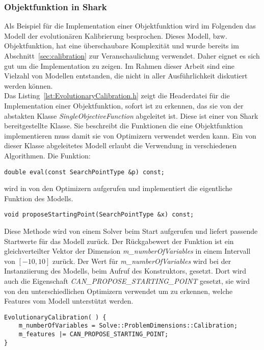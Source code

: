 \subsubsection{Objektfunktion in Shark}
\label{sec:Shark_model}
%
Als Beispiel für die Implementation einer Objektfunktion wird im Folgenden das Modell der evolutionären Kalibrierung besprochen. Dieses Modell, bzw. Objektfunktion, hat eine überschaubare Komplexität und wurde bereits im Abschnitt~\ref{sec:calibration} zur Veranschaulichung verwendet. Daher eignet es sich gut um die Implementation zu zeigen. Im Rahmen dieser Arbeit sind eine Vielzahl von Modellen entstanden, die nicht in aller Ausführlichkeit diskutiert werden können.\\
%
Das Listing~\ref{lst:EvolutionaryCalibration.h} zeigt die Headerdatei für die Implementation einer Objektfunktion, sofort ist zu erkennen, das sie von der abstakten Klasse \textit{SingleObjectiveFunction} abgeleitet ist. Diese ist einer von Shark bereitgestellte Klasse. Sie beschreibt die Funktionen die eine Objektfunktion implementieren muss damit sie von Optimizern verwendet werden kann. Ein von dieser Klasse abgeleitetes Modell erlaubt die Verwendung in verschiedenen Algorithmen. Die Funktion:
%
\begin{lstlisting}
double eval(const SearchPointType &p) const;
\end{lstlisting}
%
wird in von den Optimizern aufgerufen und implementiert die eigentliche Funktion des Modells.
%
\begin{lstlisting}[label=EvolutionaryCalibration_2]
void proposeStartingPoint(SearchPointType &x) const;
\end{lstlisting}
%
Diese Methode wird von einem Solver beim Start aufgerufen und liefert passende Startwerte für das Modell zurück. Der Rückgabewert der Funktion ist ein gleichverteilter Vektor der Dimension \textit{m\_numberOfVariables} in einem Intervall von $[-10,10]$ zurück. Der Wert für \textit{m\_numberOfVariables} wird bei der Instanziierung des Modells, beim Aufruf des Konstruktors, gesetzt. Dort wird auch die Eigenschaft \textit{CAN\_PROPOSE\_STARTING\_POINT} gesetzt, sie wird von den unterschiedlichen Optimizern verwendet um zu erkennen, welche Features vom Modell unterstützt werden.
%
\begin{lstlisting}[label=EvolutionaryCalibration_3]
	EvolutionaryCalibration( ) {
	m_numberOfVariables = Solve::ProblemDimensions::Calibration;
	m_features |= CAN_PROPOSE_STARTING_POINT;
}
\end{lstlisting}	
